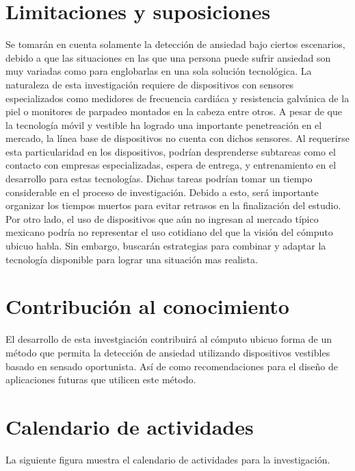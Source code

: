 \documentclass[letterpaper,12pt]{cicese}
\begin{document}
					\chapter{Limitaciones y suposiciones}
			Se tomar\'an en cuenta solamente la detecci\'on de ansiedad bajo ciertos escenarios, debido a que las situaciones en las que una persona puede sufrir ansiedad son muy variadas como para englobarlas en una sola soluci\'on tecnol\'ogica.
			La naturaleza de esta investigaci\'on requiere de dispositivos con sensores especializados como medidores de frecuencia cardi\'aca y resistencia galv\'anica de la piel o monitores de parpadeo montados en la cabeza entre otros. A pesar de que la tecnolog\'ia m\'ovil y vestible ha logrado una importante penetreaci\'on en el mercado, la l\'inea base de dispositivos no cuenta con dichos sensores. Al requerirse esta particularidad en los dispositivos, podr\'ian desprenderse subtareas como el contacto con empresas especializadas, espera de entrega, y entrenamiento en el desarrollo para estas tecnolog\'ias. Dichas tareas podr\'ian tomar un tiempo considerable en el proceso de investigaci\'on. Debido a esto, ser\'a importante organizar los tiempos muertos para evitar retrasos en la finalizaci\'on del estudio.
			Por otro lado, el uso de dispositivos que a\'un no ingresan al mercado t\'ipico mexicano podr\'ia no representar el uso cotidiano del que la visi\'on del  c\'omputo ubicuo habla. Sin embargo, buscar\'an estrategias para combinar y adaptar la tecnolog\'ia disponible para lograr una situaci\'on mas realista.
		\chapter{Contribuci\'on al conocimiento}
			El desarrollo de esta investgiaci\'on contribuir\'a al c\'omputo ubicuo forma de un m\'etodo que permita la detecci\'on de ansiedad utilizando dispositivos vestibles basado en sensado oportunista. As\'i de como recomendaciones para el dise\~no de aplicaciones futuras que utilicen este m\'etodo.
		\chapter{Calendario de actividades}
			La siguiente figura muestra el calendario de actividades para la investigaci\'on.
	\newpage
	\addcontentsline{toc}{chapter}{\normalsize\expandafter{Referencias}}
	{\normalsize
		
		
	}
	
\end{document}
